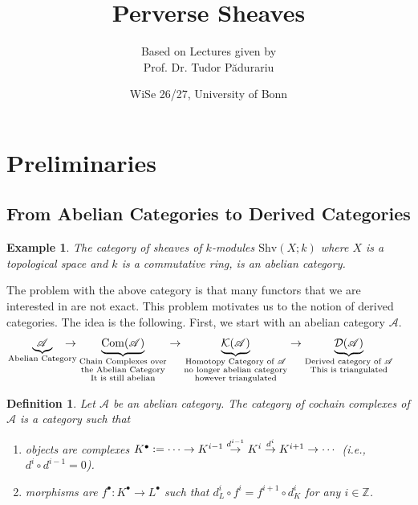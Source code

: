 \documentclass[10pt]{article}
\title{Perverse Sheaves}
\author{Based on Lectures given by\\Prof. Dr. Tudor Pădurariu}
\date{WiSe 26/27, University of Bonn}
\numberwithin{equation}{section}
\newtheorem{definition}{Definition}[section]
\newtheorem{example}{Example}[section]
\newcommand{\defeq}{\vcentcolon=}
\newcommand{\Z}[0]{\mathbb{Z}}
\newcommand{\cK}[0]{\mathcal{K}}
\newcommand{\cD}[0]{\mathcal{D}}
\newcommand{\sA}[0]{\mathscr{A}}
\newcommand{\Shv}[0]{\mathrm{Shv}}
\newcommand{\Com}[0]{\mathrm{Com}}
\begin{document}
\maketitle

\section{Preliminaries}
\subsection{From Abelian Categories to Derived Categories}
\begin{example}
    The category of sheaves of $k$-modules $\Shv(X;k)$ where $X$ is a topological space and $k$ is a commutative ring, is an abelian category.
\end{example}

The problem with the above category is that many functors that we are interested in are not exact. This problem motivates us to the notion of derived categories. The idea is the following. 
First, we start with an abelian category $\sA$. 
\begin{equation*}
    \underbrace{\sA}_{\text{\makebox[35pt][c]{Abelian Category}}}\to \underbrace{\Com(\sA)}_{\substack{\text{Chain Complexes over}\\\text{the Abelian Category}\\\text{It is still abelian}}}\to\underbrace{\cK(\sA)}_{\substack{\text{Homotopy Category of $\sA$}\\\text{no longer abelian category}\\\text{however triangulated}}}\to\underbrace{\cD(\sA)}_{\substack{\text{Derived category of $\sA$}\\\text{This is triangulated}}}
\end{equation*}

\begin{definition}
    Let $\sA$ be an abelian category. The category of cochain complexes of $\sA$ is a category such that 
    \begin{enumerate}
        \item objects are complexes $K^\bullet\defeq \cdots\to K^{i-1}\stackrel{d^{i-1}}{\to} K^i\stackrel{d^{i}}{\to} K^{i+1}\to \cdots$ (i.e., $d^i\circ d^{i-1}=0$).
        \item morphisms are $f^\bullet:K^\bullet\to L^\bullet$ such that $d^i_L\circ f^{i} = f^{i+1}\circ d^{i}_K$ for any $i\in\Z$.
    \end{enumerate}
\end{definition}
\end{document}
